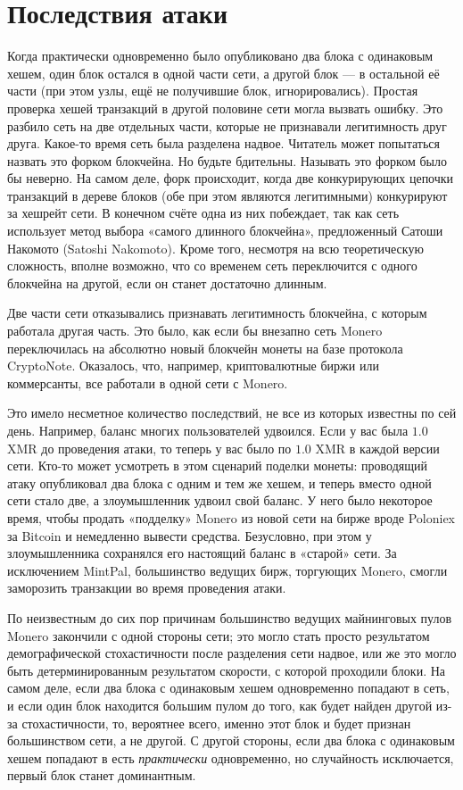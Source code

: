 \documentclass{mrl}
\begin{document}
\section{Последствия атаки}

Когда практически одновременно было опубликовано два блока с одинаковым хешем, один блок остался в одной части сети, а другой блок — в остальной её части (при этом узлы, ещё не получившие блок, игнорировались). Простая проверка хешей транзакций в другой половине сети могла вызвать ошибку. Это разбило сеть на две отдельных части, которые не признавали легитимность друг друга. Какое-то время сеть была разделена надвое. Читатель может попытаться назвать это форком блокчейна. Но будьте бдительны. Называть это форком было бы неверно. На самом деле, форк происходит, когда две конкурирующих цепочки транзакций в дереве блоков (обе при этом являются легитимными) конкурируют за хешрейт сети. В конечном счёте одна из них побеждает, так как сеть использует метод выбора «самого длинного блокчейна», предложенный Сатоши Накомото (Satoshi Nakomoto). Кроме того, несмотря на всю теоретическую сложность, вполне возможно, что со временем сеть переключится с одного блокчейна на другой, если он станет достаточно длинным.

Две части сети отказывались признавать легитимность блокчейна, с которым работала другая часть. Это было, как если бы внезапно сеть Monero переключилась на абсолютно новый блокчейн монеты на базе протокола CryptoNote. Оказалось, что, например, криптовалютные биржи или коммерсанты, все работали в одной сети с Monero.

Это имело несметное количество последствий, не все из которых известны по сей день. Например, баланс многих пользователей удвоился. Если у вас была $1.0$ XMR до проведения атаки, то теперь у вас было по $1.0$ XMR в каждой версии сети. Кто-то может усмотреть в этом сценарий поделки монеты: проводящий атаку опубликовал два блока с одним и тем же хешем, и теперь вместо одной сети стало две, а злоумышленник удвоил свой баланс. У него было некоторое время, чтобы продать «подделку» Monero из новой сети на бирже вроде Poloniex за Bitcoin и немедленно вывести средства. Безусловно, при этом у злоумышленника сохранялся его настоящий баланс в «старой» сети. За исключением MintPal, большинство ведущих бирж, торгующих Monero, смогли заморозить транзакции во время проведения атаки.

По неизвестным до сих пор причинам большинство ведущих майнинговых пулов Monero закончили с одной стороны сети; это могло стать просто результатом демографической стохастичности после разделения сети надвое, или же это могло быть детерминированным результатом скорости, с которой проходили блоки. На самом деле, если два блока с одинаковым хешем одновременно попадают в сеть, и если один блок находится большим пулом до того, как будет найден другой из-за стохастичности, то, вероятнее всего, именно этот блок и будет признан большинством сети, а не другой. С другой стороны, если два блока с одинаковым хешем попадают в есть \emph{практически} одновременно, но случайность исключается, первый блок станет доминантным.
\end{document}
